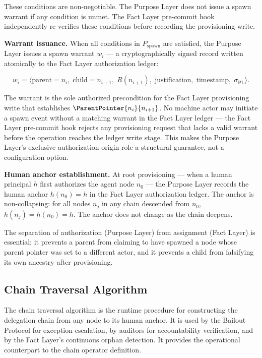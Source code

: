 These conditions are non-negotiable. The Purpose Layer does not issue a spawn warrant if any condition is unmet. The Fact Layer pre-commit hook independently re-verifies these conditions before recording the provisioning write.

\medskip
\noindent\textbf{Warrant issuance.} When all conditions in $P_{\mathrm{spawn}}$ are satisfied, the Purpose Layer issues a spawn warrant $w_i$ — a cryptographically signed record written atomically to the Fact Layer authorization ledger:

\begin{equation}
w_i = \bigl\langle
\text{parent}=n_i,\;
\text{child}=n_{i+1},\;
R(n_{i+1}),\;
\text{justification},\;
\text{timestamp},\;
\sigma_{\text{PL}}
\bigr\rangle .
\label{eq:spawn-warrant}
\end{equation}

The warrant is the sole authorized precondition for the Fact Layer provisioning write that establishes $\ParentPointer{n_i}{n_{i+1}}$. No machine actor may initiate a spawn event without a matching warrant in the Fact Layer ledger — the Fact Layer pre-commit hook rejects any provisioning request that lacks a valid warrant before the operation reaches the ledger write stage. This makes the Purpose Layer's exclusive authorization origin role a structural guarantee, not a configuration option.

\medskip
\noindent\textbf{Human anchor establishment.} At root provisioning — when a human principal $h$ first authorizes the agent node $n_0$ — the Purpose Layer records the human anchor $h(n_0) = h$ in the Fact Layer authorization ledger. The anchor is non-collapsing: for all nodes $n_j$ in any chain descended from $n_0$, $h(n_j) = h(n_0) = h$. The anchor does not change as the chain deepens.

The separation of authorization (Purpose Layer) from assignment (Fact Layer) is essential: it prevents a parent from claiming to have spawned a node whose parent pointer was set to a different actor, and it prevents a child from falsifying its own ancestry after provisioning.

\subsection{Chain Traversal Algorithm}
\label{sec:chain-traversal}

The chain traversal algorithm is the runtime procedure for constructing the delegation chain from any node to its human anchor. It is used by the Bailout Protocol for exception escalation, by auditors for accountability verification, and by the Fact Layer's continuous orphan detection. It provides the operational counterpart to the chain operator definition.


